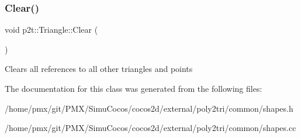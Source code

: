 \subsubsection{\texorpdfstring{Clear()}{Clear()}\hspace{0.1cm}{\footnotesize\ttfamily [2/2]}}
{\footnotesize\ttfamily void p2t\+::\+Triangle\+::\+Clear (\begin{DoxyParamCaption}{ }\end{DoxyParamCaption})}

Clears all references to all other triangles and points 

The documentation for this class was generated from the following files\+:\begin{DoxyCompactItemize}
\item 
/home/pmx/git/\+P\+M\+X/\+Simu\+Cocos/cocos2d/external/poly2tri/common/shapes.\+h\item 
/home/pmx/git/\+P\+M\+X/\+Simu\+Cocos/cocos2d/external/poly2tri/common/shapes.\+cc\end{DoxyCompactItemize}
